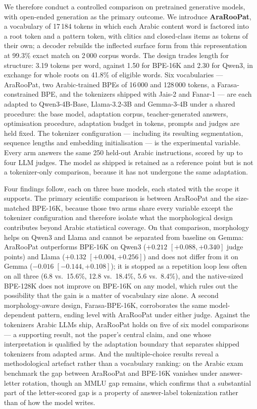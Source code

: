 \documentclass[a4paper,fleqn]{cas-sc}
\begin{document}
We therefore conduct a controlled comparison on pretrained generative models, with open-ended generation as the primary outcome. We introduce \textbf{AraRooPat}, a vocabulary of 17\,184 tokens in which each Arabic content word is factored into a root token and a pattern token, with clitics and closed-class items as tokens of their own; a decoder rebuilds the inflected surface form from this representation at 99.3\% exact match on 2\,000 corpus words. The design trades length for structure: 3.19 tokens per word, against 1.50 for BPE-16K and 2.30 for Qwen3, in exchange for whole roots on 41.8\% of eligible words. Six vocabularies --- AraRooPat, two Arabic-trained BPEs of 16\,000 and 128\,000 tokens, a Farasa-constrained BPE, and the tokenizers shipped with Jais-2 and Fanar-1 --- are each adapted to Qwen3-4B-Base, Llama-3.2-3B and Gemma-3-4B under a shared procedure: the base model, adaptation corpus, teacher-generated answers, optimisation procedure, adaptation budget in tokens, prompts and judges are held fixed. The tokenizer configuration --- including its resulting segmentation, sequence lengths and embedding initialisation --- is the experimental variable. Every arm answers the same 250 held-out Arabic instructions, scored by up to four LLM judges. The model as shipped is retained as a reference point but is not a tokenizer-only comparison, because it has not undergone the same adaptation.

Four findings follow, each on three base models, each stated with the scope it supports. The primary scientific comparison is between AraRooPat and the size-matched BPE-16K, because those two arms share every variable except the tokenizer configuration and therefore isolate what the morphological design contributes beyond Arabic statistical coverage. On that comparison, morphology helps on Qwen3 and Llama and cannot be separated from baseline on Gemma: AraRooPat outperforms BPE-16K on Qwen3 ($+0.212$ $[+0.088,+0.340]$ judge points) and Llama ($+0.132$ $[+0.004,+0.256]$) and does not differ from it on Gemma ($-0.016$ $[-0.144,+0.108]$); it is stopped as a repetition loop less often on all three (6.8 vs.\ 15.6\%, 12.8 vs.\ 18.4\%, 5.6 vs.\ 8.4\%), and the native-sized BPE-128K does not improve on BPE-16K on any model, which rules out the possibility that the gain is a matter of vocabulary size alone. A second morphology-aware design, Farasa-BPE-16K, corroborates the same model-dependent pattern, ending level with AraRooPat under either judge. Against the tokenizers Arabic LLMs ship, AraRooPat holds on five of six model comparisons --- a supporting result, not the paper's central claim, and one whose interpretation is qualified by the adaptation boundary that separates shipped tokenizers from adapted arms. And the multiple-choice results reveal a methodological artefact rather than a vocabulary ranking: on the Arabic exam benchmark the gap between AraRooPat and BPE-16K vanishes under answer-letter rotation, though an MMLU gap remains, which confirms that a substantial part of the letter-scored gap is a property of answer-label tokenization rather than of how the model writes.
\end{document}
